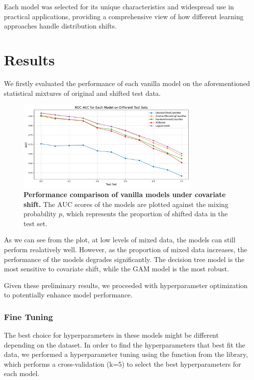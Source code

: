Each model was selected for its unique characteristics and widespread use in practical applications, providing a comprehensive view of how different learning approaches handle distribution shifts.

\section{Results}

We firstly evaluated the performance of each vanilla model on the aforementioned statistical mixtures of original and shifted test data. 

\begin{figure}[H]
    \centering
    \includegraphics[width=0.8\textwidth]{assets/vanilla.png} 
    \caption{\textbf{Performance comparison of vanilla models under covariate shift.} The AUC scores of the models are plotted against the mixing probability $p$, which represents the proportion of shifted data in the test set.}
    \label{fig:vanilla-models-perf}
\end{figure}

As we can see from the plot, at low levels of mixed data, the models can still perform realatively well. However, as the proportion of mixed data increases, the performance of the models degrades significantly. The decision tree model is the most sensitive to covariate shift, while the GAM model is the most robust.

Given these preliminary results, we proceeded with hyperparameter optimization to potentially enhance model performance.

\subsubsection{Fine Tuning}

The best choice for hyperparameters in these models might be different depending on the dataset. In order to find the hyperparameters that best fit the data, we performed a hyperparameter tuning using the  function from the  library, which performs a cross-validation (k=5) to select the best hyperparameters for each model.


